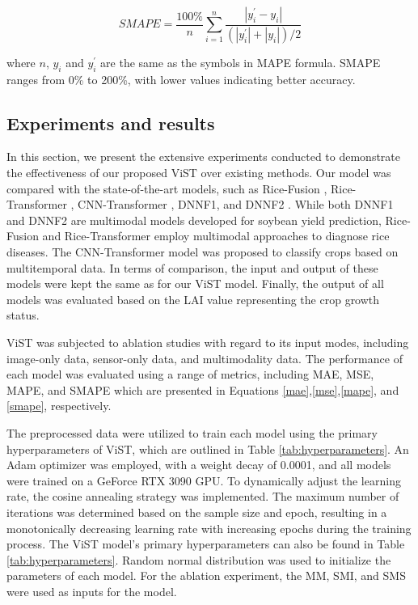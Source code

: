 \documentclass[acmsmall, screen]{acmart}
\begin{document}
\begin{equation}
  SMAPE=\frac{100\%}{n}\sum_{i=1}^{n}\frac{\left|y_i^\prime-y_i\right|}{\left(\left|y_i^\prime\right|+\left|y_i\right|\right)/2} \label{smape}
\end{equation}

where \begin{math}
  n
\end{math}, \begin{math}
  y_i
\end{math} and \begin{math}
  y_i^\prime
\end{math} are the same as the symbols in MAPE formula. SMAPE ranges from 0\% to 200\%, with lower values indicating better accuracy.


\subsection{Experiments and results}

In this section, we present the extensive experiments conducted to demonstrate the effectiveness of our proposed ViST over existing methods. Our model was compared with the state-of-the-art models, such as Rice-Fusion \cite{9672157}, Rice-Transformer \cite{9864182}, CNN-Transformer \cite{8999620}, DNNF1, and DNNF2 \cite{maimaitijiang_soybean_2020}. While both DNNF1 and DNNF2 are multimodal models developed for soybean yield prediction, Rice-Fusion and Rice-Transformer employ multimodal approaches to diagnose rice diseases. The CNN-Transformer model was proposed to classify crops based on multitemporal data. In terms of comparison, the input and output of these models were kept the same as for our ViST model. Finally, the output of all models was evaluated based on the LAI value representing the crop growth status.

ViST was subjected to ablation studies with regard to its input modes, including image-only data, sensor-only data, and multimodality data. The performance of each model was evaluated using a range of metrics, including MAE, MSE, MAPE, and SMAPE which are presented in Equations \ref{mae},\ref{mse},\ref{mape}, and \ref{smape}, respectively.

The preprocessed data were utilized to train each model using the primary hyperparameters of ViST, which are outlined in Table \ref{tab:hyperparameters}. An Adam optimizer was employed, with a weight decay of 0.0001, and all models were trained on a GeForce RTX 3090 GPU. To dynamically adjust the learning rate, the cosine annealing strategy was implemented. The maximum number of iterations was determined based on the sample size and epoch, resulting in a monotonically decreasing learning rate with increasing epochs during the training process. The ViST model's primary hyperparameters can also be found in Table \ref{tab:hyperparameters}. Random normal distribution was used to initialize the parameters of each model. For the ablation experiment, the MM, SMI, and SMS were used as inputs for the model.
\end{document}
